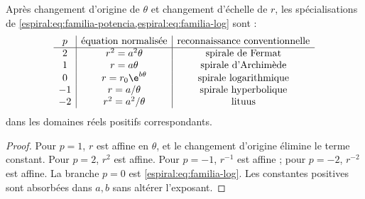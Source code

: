 \begin{theorem}
Après changement d'origine de \(\theta\) et changement d'échelle de \(r\), les spécialisations de \cref{espiral:eq:familia-potencia,espiral:eq:familia-log} sont :
\[
\begin{array}{c|c|c}
p&\text{équation normalisée}&\text{reconnaissance conventionnelle}\\ \hline
2&r^2=a^2\theta&\text{spirale de Fermat}\\
1&r=a\theta&\text{spirale d'Archimède}\\
0&r=r_0\e^{b\theta}&\text{spirale logarithmique}\\
-1&r=a/\theta&\text{spirale hyperbolique}\\
-2&r^2=a^2/\theta&\text{lituus}
\end{array}
\]
dans les domaines réels positifs correspondants.
\end{theorem}
\begin{proof}
Pour \(p=1\), \(r\) est affine en \(\theta\), et le changement d'origine élimine le terme constant. Pour \(p=2\), \(r^2\) est affine. Pour \(p=-1\), \(r^{-1}\) est affine ; pour \(p=-2\), \(r^{-2}\) est affine. La branche \(p=0\) est \cref{espiral:eq:familia-log}. Les constantes positives sont absorbées dans \(a,b\) sans altérer l'exposant.
\end{proof}

